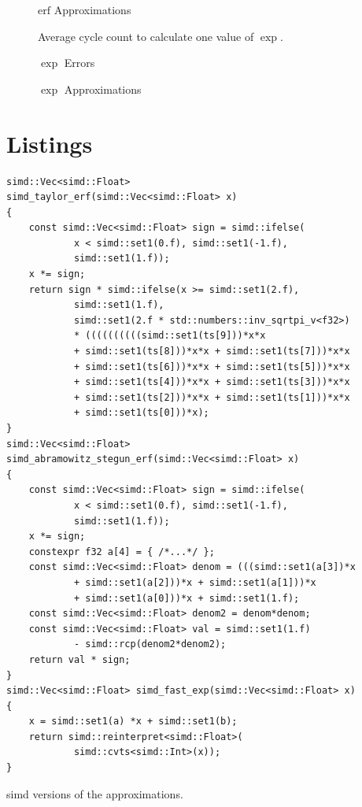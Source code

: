 \documentclass[a4paper, 11pt]{memoir}
\newcommand*{\erf}{\text{erf}}
\begin{document}
    \begin{figure}[ht]
        \centering
        
        \caption{$\erf$ Approximations}
        \label{fig:erf_approx}
    \end{figure}

    \begin{figure}[ht]
        \centering
        
        \caption{Average cycle count to calculate one value of $\exp$.}
        \label{fig:cycles_exp}
    \end{figure}

    \begin{figure}[ht]
        \centering
        
        \caption{$\exp$ Errors}
        \label{fig:exp_errors}
    \end{figure}
    
    \begin{figure}[ht]
        \centering
        
        \caption{$\exp$ Approximations}
        \label{fig:exp_approx}
    \end{figure}

    \chapter{Listings}
    \label{ch:listings}
    \begin{listing}[ht]
        \begin{verbatim}
simd::Vec<simd::Float>
simd_taylor_erf(simd::Vec<simd::Float> x)
{
    const simd::Vec<simd::Float> sign = simd::ifelse(
            x < simd::set1(0.f), simd::set1(-1.f),
            simd::set1(1.f));
    x *= sign;
    return sign * simd::ifelse(x >= simd::set1(2.f),
            simd::set1(1.f),
            simd::set1(2.f * std::numbers::inv_sqrtpi_v<f32>)
            * ((((((((((simd::set1(ts[9]))*x*x
            + simd::set1(ts[8]))*x*x + simd::set1(ts[7]))*x*x
            + simd::set1(ts[6]))*x*x + simd::set1(ts[5]))*x*x
            + simd::set1(ts[4]))*x*x + simd::set1(ts[3]))*x*x
            + simd::set1(ts[2]))*x*x + simd::set1(ts[1]))*x*x
            + simd::set1(ts[0]))*x);
}
simd::Vec<simd::Float>
simd_abramowitz_stegun_erf(simd::Vec<simd::Float> x)
{
    const simd::Vec<simd::Float> sign = simd::ifelse(
            x < simd::set1(0.f), simd::set1(-1.f),
            simd::set1(1.f));
    x *= sign;
    constexpr f32 a[4] = { /*...*/ };
    const simd::Vec<simd::Float> denom = (((simd::set1(a[3])*x
            + simd::set1(a[2]))*x + simd::set1(a[1]))*x
            + simd::set1(a[0]))*x + simd::set1(1.f);
    const simd::Vec<simd::Float> denom2 = denom*denom;
    const simd::Vec<simd::Float> val = simd::set1(1.f)
            - simd::rcp(denom2*denom2);
    return val * sign;
}
simd::Vec<simd::Float> simd_fast_exp(simd::Vec<simd::Float> x)
{
    x = simd::set1(a) *x + simd::set1(b);
    return simd::reinterpret<simd::Float>(
            simd::cvts<simd::Int>(x));
}
        \end{verbatim}
        \caption{\gls{simd} versions of the approximations.}
        \label{lst:simd_approx}
    \end{listing}
\end{document}
